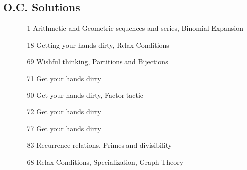 \documentclass[11pt]{article}
\begin{document}
\subsection{O.C. Solutions}
\begin{itemize}
    \item[\text{Sept 27 Sub. }] \begin{itemize}
        \item[1] Arithmetic and Geometric sequences and series, Binomial Expansion
    \end{itemize}
    \item[\text{Oct 4 Sub. }] \begin{itemize}
        \item[18] Getting your hands dirty, Relax Conditions
    \end{itemize}
    \item[\text{Nov 8 Sub. }] \begin{itemize}
        \item[69] Wishful thinking, Partitions and Bijections
        \item[71] Get your hands dirty
    \end{itemize}
    \item[\text{Nov 15 Sub. }] \begin{itemize}
        \item[90] Get your hands dirty, Factor tactic 
    \end{itemize}
    \item[\text{Nov 22 Sub. }] \begin{itemize}
        \item[72] Get your hands dirty
        \item[77] Get your hands dirty
        \item[83] Recurrence relations, Primes and divisibility
    \end{itemize}
    \item[\text{Dec 3 ReSub.}]\begin{itemize}
        \item[68] Relax Conditions, Specialization, Graph Theory 
    \end{itemize}
\end{itemize}
\end{document}
